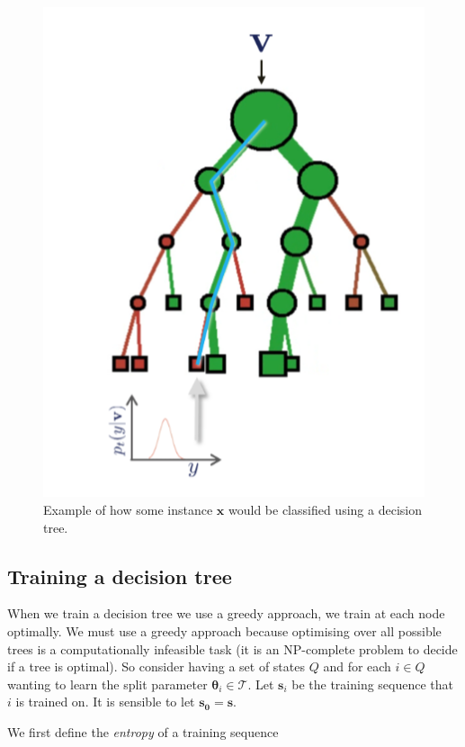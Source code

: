 \documentclass[12pt,twoside,notitlepage]{report}
\newcommand{\vc}[1]{\mathbf{#1}}
\newcommand{\cl}[1]{\mathcal{#1}}
\begin{document}
            \begin{figure}[H]
                \centering
                \includegraphics[scale=0.5]{tree_example_classification}
                \caption{Example of how some instance $\vc{x}$ would be classified using a decision tree.}
                \label{fig:decision_tree_classify}
            \end{figure}

        \subsection{Training a decision tree}
            When we train a decision tree we use a greedy approach, we train at each node optimally. We must use a 
            greedy approach because optimising over all possible trees is a computationally infeasible task (it is an 
            NP-complete problem to decide if a tree is optimal). So consider having a set of states $Q$ and for each 
            $i \in Q$ wanting to learn the split parameter $\vc{\theta}_i \in \cl{T}$. Let $\vc{s}_i$ be the training 
            sequence that $i$ is trained on. It is sensible to let $\vc{s_0}=\vc{s}$. 

            We first define the \textit{entropy} of a training sequence
\end{document}
